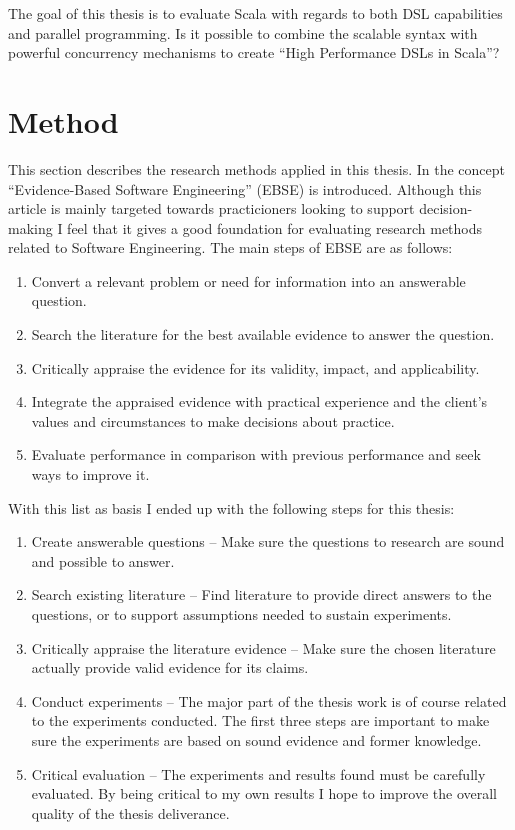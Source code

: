 \documentclass[a4paper,english]{report}
\begin{document}
The goal of this thesis is to evaluate Scala with regards to both DSL
capabilities and parallel programming. Is it possible to combine the
scalable syntax with powerful concurrency mechanisms to create ``High
Performance DSLs in Scala''?

\section{Method}
\label{sec:method}

This section describes the research methods applied in this
thesis. In\cite{dyb08} the concept ``Evidence-Based Software
Engineering'' (EBSE) is introduced. Although this article is mainly
targeted towards practicioners looking to support decision-making I
feel that it gives a good foundation for evaluating research methods
related to Software Engineering. The main steps of EBSE are as
follows:

\begin{enumerate}
\item Convert a relevant problem or need for information into an
  answerable question.
\item Search the literature for the best available evidence to answer
  the question.
\item Critically appraise the evidence for its validity, impact, and
  applicability.
\item Integrate the appraised evidence with practical experience and
  the client's values and circumstances to make decisions about
  practice.
\item Evaluate performance in comparison with previous performance and
  seek ways to improve it.
\end{enumerate}

With this list as basis I ended up with the following steps for this
thesis:

\begin{enumerate}
\item Create answerable questions -- Make sure the questions to
  research are sound and possible to answer.
\item Search existing literature -- Find literature to provide direct
  answers to the questions, or to support assumptions needed to
  sustain experiments.
\item Critically appraise the literature evidence -- Make sure the
  chosen literature actually provide valid evidence for its claims.
\item Conduct experiments -- The major part of the thesis work is of
  course related to the experiments conducted. The first three steps
  are important to make sure the experiments are based on sound
  evidence and former knowledge.
\item Critical evaluation -- The experiments and results found must be
  carefully evaluated. By being critical to my own results I hope to
  improve the overall quality of the thesis deliverance.
\end{enumerate}
\end{document}
